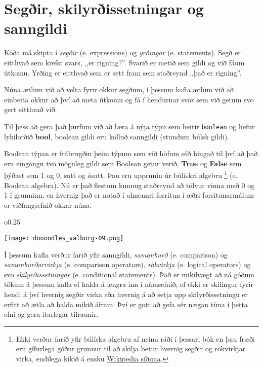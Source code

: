 
\chapter{Segðir, skilyrðissetningar og sanngildi}\label{k:segðir}
Kóða má skipta í \emph{segðir} (e. expressions) og \emph{yrðingar} (e. statements).
Segð er eitthvað sem krefst svars, ,,er rigning?''.
Svarið er metið sem gildi og við fáum útkomu.
Yrðing er eitthvað sem er sett fram sem staðreynd ,,það er rigning''.

Núna ætlum við að velta fyrir okkur segðum, í þessum kafla ætlum við að einbeita okkur að því að meta útkomu og fá í hendurnar svör sem við getum svo gert eitthvað við.

Til þess að gera það þurfum við að læra á nýja týpu sem heitir \texttt{boolean} og hefur lykilorðið \textbf{bool}, boolean gildi eru kölluð sanngildi (stundum búlsk gildi).

Boolean týpan er frábrugðin þeim týpum sem við höfum séð hingað til því að það eru eingöngu tvö möguleg gildi sem Boolean getur verið, \textbf{True} og \textbf{False} sem þýðast sem 1 og 0, satt og ósatt.
Þau eru upprunin úr búlískri algebru \footnote{Ekki verður farið yfir búlíska algebru af neinu ráði í þessari bók en þau fræði eru gífurlega góður grunnur til að skilja betur hvernig segðir og rökvirkjar virka, endilega kíkið á ensku \href{https://en.wikipedia.org/wiki/Boolean_algebra}{Wikipedia síðuna}.} (e. Boolean algebra). 
Nú er það flestum kunnug staðreynd að tölvur vinna með 0 og 1 í grunninn, en hvernig það er notað í almennri forritun í æðri forritunarmálum er viðfangsefnið okkar núna.

\begin{wrapfigure}{o}{0.25\textwidth} %
	\begin{center}
		\texttt{[image: doooodles\_valborg-09.png]}
	\end{center}
\end{wrapfigure}

Í þessum kafla verður farið yfir sanngildi,  \emph{samanburð} (e. comparison) og \emph{samanburðarvirkja} (e. comparison operators), \emph{rökvirkja} (e. logical operators) og svo \emph{skilyrðissetningar} (e. conditional statements).
Það er mikilvægt að ná góðum tökum á þessum kafla ef halda á lengra inn í námsefnið, ef ekki er skilingur fyrir hendi á því hvernig segðir virka eða hvernig á að setja upp skilyrðissetningu er erfitt að ætla að halda mikið áfram.
Því er gott að gefa sér nægan tíma í þetta efni og gera ítarlegar tilraunir.

